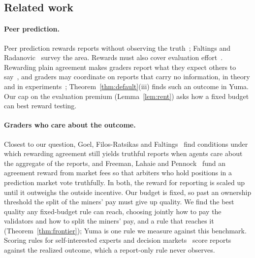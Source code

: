 \documentclass[sigconf,anonymous,review]{acmart}
\numberwithin{equation}{section}
\begin{document}
\subsection{Related work}

\paragraph{Peer prediction.} Peer prediction rewards reports without
observing the truth~\cite{miller2005peer,prelec2004bayesian,witkowski2012peer,
shnayder2016informed,kong2019information}; Faltings and
Radanovic~\cite{faltings2017game} survey the area. Rewards must also cover
evaluation effort~\cite{dasgupta2013crowdsourced,liu2017sequential,
ho2015incentivizing}. Rewarding plain agreement makes graders report what
they expect others to say~\cite{waggoner2014output}, and graders may
coordinate on reports that carry no information, in theory and in
experiments~\cite{jurca2009mechanisms,gao2014trick,gao2019incentivizing};
Theorem~\ref{thm:default}(iii) finds such an outcome in Yuma. Our cap on the
evaluation premium (Lemma~\ref{lem:rent}) asks how a fixed budget can best
reward testing.

\paragraph{Graders who care about the outcome.} Closest to our question, Goel,
Filos-Ratsikas and Faltings~\cite{goel2020peer} find conditions under which
rewarding agreement still yields truthful reports when agents care about the
aggregate of the reports, and Freeman, Lahaie and
Pennock~\cite{freeman2017crowdsourced} fund an agreement reward from market
fees so that arbiters who hold positions in a prediction market vote
truthfully. In both, the reward for reporting is scaled up until it outweighs
the outside incentive. Our budget is fixed, so past an ownership threshold the
split of the miners' pay must give up quality. We find the best quality any
fixed-budget rule can reach, choosing jointly how to pay the validators and
how to split the miners' pay, and a rule that reaches it
(Theorem~\ref{thm:frontier}); Yuma is one rule we measure against this
benchmark.
Scoring rules for self-interested experts and decision
markets~\cite{boutilier2012eliciting,chen2011decision} score reports against
the realized outcome, which a report-only rule never observes.
\end{document}

